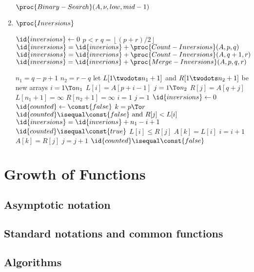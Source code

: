 \documentclass{report}
\newcommand{\floor}[1]{\left\lfloor #1 \right\rfloor}
\begin{document}
\begin{enumerate}
\begin{codebox}
    \li \Else \Return $\proc{Binary-Search}(A, \nu, low, mid-1)$
        \End
    \end{codebox}
    \item $\proc{Inversions}$
    \begin{codebox}
     \label{alg:count-inversions}
    \li $\id{inversions} \gets 0$
    \li \If $p < r$
        \Then 
    \li     $q = \floor{(p+r)/2}$
    \li     $\id{inversions} = \id{inverions} + \proc{Count-Inversions}(A,p,q)$
    \li     $\id{inversions} = \id{inverions} + \proc{Count-Inversions}(A,q+1,r)$
    \li     $\id{inversions} = \id{inverions} + \proc{Merge-Inversions}(A,p,q,r)$
        \End
    \li \Return {}
    \end{codebox}
    \begin{codebox}
    \li $n_1 = q-p+1$
    \li $n_2 = r-q$
    \li let $L[1 \twodots n_1 + 1]$ and $R[1 \twodots n_2 + 1]$ be new arrays 
    \li \For $i = 1 \To n_1$
        \Do 
    \li     $L[i] = A[p+i-1]$
        \End 
    \li \For $j = 1 \To n_2$ 
        \Do 
    \li     $R[j] = A[q+j]$
        \End 
    \li $L[n_1 + 1] = \infty$ 
    \li $R[n_2 + 1] = \infty$
    \li $i = 1$
    \li $j = 1$
    \li $\id{inversions} \gets 0$
    \li $\id{counted} \gets \const{false}$
    \li \For $k = p \To r$
        \Do
    \li     \If $\id{counted} \isequal \const{false} \text{ and } R[j] < L[i]$
            \Then
    \li         $\id{inversions} = \id{inverions} + n_1 - i + 1$
    \li         $\id{counted} \isequal \const{true}$
            \End
    \li     \If $L[i] \leq R[j]$
            \Then 
    \li         $A[k] = L[i]$
    \li         $i = i+1$
    \li     \Else $A[k] = R[j]$
    \li         $j = j+1$
    \li         $\id{counted} \isequal \const{false}$
            \End
        \End
    \li \Return {}
    \end{codebox}
\end{enumerate}

\chapter{Growth of Functions}

\section{Asymptotic notation}

\section{Standard notations and common functions}

\section{Algorithms}
\end{document}
